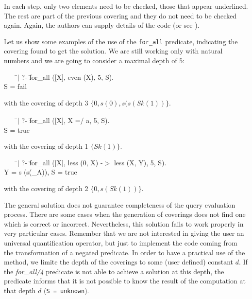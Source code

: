 \documentclass[]{llncs}
\newenvironment{mytabbing}
   {\vspace{0.3em}\begin{small}\begin{tabbing}}
   {\end{tabbing}\end{small}\vspace{0.3em}}
\begin{document}
In each step, only two elements need to be checked, those that appear
underlined. The rest are part of the previous covering and they
do not need to be checked again. Again, the authors can supply
details of the code (or see \cite{Susana}).

Let us show some examples of the use of the {\tt for\_all} predicate,
indicating the covering found to get the solution. We are still
working only with natural numbers and we are going to consider a
maximal depth of 5:

\begin{tt}
\begin{mytabbing}
~~~~\=$|$ ?- \=for\_all ([X], even (X), 5, S). \\
    \>       \>S = fail 
\end{mytabbing}
\end{tt}

\noindent
with the covering of depth 3 $\{0, \underline{s (0)}, s(s(Sk(1))\}$.

\begin{tt}
\begin{mytabbing}
~~~~\=$|$ ?- \= for\_all ([X], X =/ a, 5, S). \\
    \>       \> S = true
\end{mytabbing}
\end{tt}

\noindent
with the covering of depth 1 $\{Sk (1)\}$.

\begin{tt}
\begin{mytabbing}
~~~~\=$|$ ?- \=for\_all ([X], less (0, X) -$>$ less (X, Y), 5, S). \\
    \>       \>Y = s (s(\_A)), S = true 
\end{mytabbing}
\end{tt}

\noindent
with the covering of depth 2 $\{0, s (Sk (1))\}$.
\bigskip


The general solution does not guarantee completeness of the
query evaluation process. There are some cases when the generation
of coverings does not find one which is correct or incorrect. Nevertheless,
this solution fails to work properly in very particular cases.
Remember that we are not interested in giving the user an universal
quantification operator, but just to implement the code coming
from the transformation of a negated predicate. In order to have 
a practical use of the method, we limite the depth of the coverings
to some (user defined) constant $d$. If the {\em for\_all/4} predicate is 
not able to achieve a solution at this depth, the predicate informs that
it is not possible to know the result of the computation at that depth
$d$ ({\tt S = unknown}).
\end{document}
